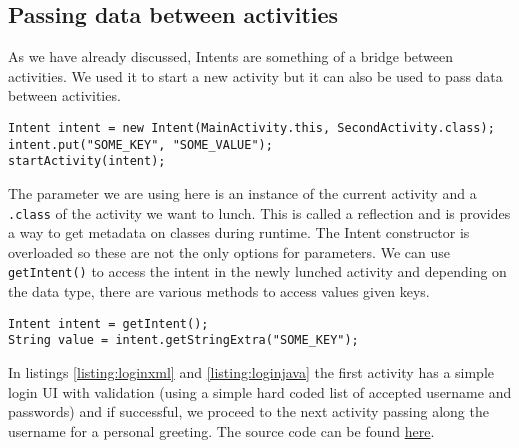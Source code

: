 \subsection{Passing data between activities}
As we have already discussed, Intents are something of a bridge between activities. We used it to start a new activity but it can also be used to pass data between activities.

\begin{lstlisting}[style=A_Java]
Intent intent = new Intent(MainActivity.this, SecondActivity.class);
intent.put("SOME_KEY", "SOME_VALUE");
startActivity(intent);
\end{lstlisting}

The parameter we are using here is an instance of the current activity and a \texttt{.class} of the activity we want to lunch. This is called a reflection and is provides a way to get metadata on classes during runtime. The Intent constructor is overloaded so these are not the only options for parameters. We can use \texttt{getIntent()} to access the intent in the newly lunched activity and depending on the data type, there are various methods to access values given keys.

\begin{lstlisting}[style=A_Java]
Intent intent = getIntent();
String value = intent.getStringExtra("SOME_KEY");
\end{lstlisting}

In listings \ref{listing:loginxml} and \ref{listing:loginjava} the first activity has a simple login UI with validation (using a simple hard coded list of accepted username and passwords) and if successful, we proceed to the next activity passing along the username for a personal greeting. The source code can be found \href{https://github.com/JonSteinn/AndroidDevelopment/tree/master/examples/lab3/login}{here}.

